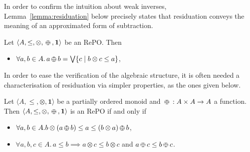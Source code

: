 \documentclass{llncs}
\newcommand{\shortNoProof}[1]{ }
\def\monid{{\mathbf 0}}
\def\monop{\otimes}
\def\odiv{\, {\ominus\hspace{-7.7pt} \div} \,}
\def\monid{\mathbf{1}}
\begin{document}
In order to confirm the intuition about weak inverses,
Lemma~\ref{lemma:residuation} below precisely states that residuation conveys the meaning of 
an approximated form of subtraction.

\begin{lemma}\label{lemma:residuation}
	Let $\langle A, \leq, \monop, \odiv, \monid \rangle$ be an RePO.
	Then
	\begin{itemize}
		\item $\forall a, b \in A.\, a \odiv b = \bigvee \{ c \mid b \monop c \leq a\}$,
	\end{itemize}
\end{lemma}

\shortNoProof{
\begin{proof}
	By definition $a \odiv b$ is an upper bound of 
	$\{ c \mid b \monop c \leq a\}$ and $b \monop (a \odiv b) \leq a$.
\qed
\end{proof}
}


In order to ease the verification of the algebraic structure, it is often needed
a characterisation of residuation via simpler properties,
as the ones given below.

\begin{lemma}
\label{mono}
Let $\langle A, \leq, \monop, \monid \rangle$ be a partially ordered monoid  and
	$\odiv: A \times A \rightarrow A$ a function. Then $\langle A, \leq, \monop, \odiv, \monid \rangle$ is an RePO if and only if
	\begin{itemize}
		\item $\forall a, b \in A. b \monop (a \odiv b) \leq a \leq (b \monop a) \odiv b$,
		\item $\forall a, b, c \in A.\, a \leq b \implies a \otimes c \leq b \otimes c$ and $a\odiv c \leq b \odiv c$.
\end{itemize}
\end{lemma}
\end{document}

